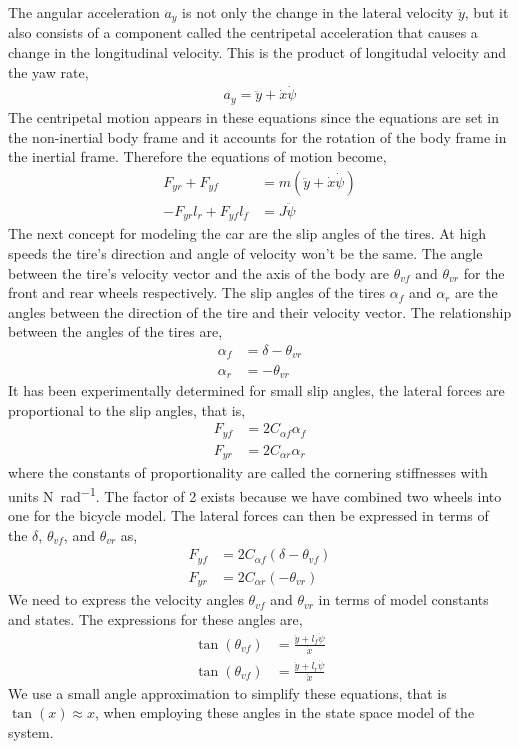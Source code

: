 \documentclass{article}
\begin{document}
The angular acceleration $a_y$ is not only the change in the lateral velocity $\ddot{y}$, but it also consists of a
component called the centripetal acceleration that causes a change in the longitudinal velocity. This is the product
of longitudal velocity and the yaw rate,
\begin{align}
    a_y = \ddot{y} + \dot{x}\dot{\psi}
\end{align}
The centripetal motion appears in these equations since the equations are set in the non-inertial body frame and it
accounts for the rotation of the body frame in the inertial frame. Therefore the equations of motion become,
\begin{align}
    F_{yr} + F_{yf} &= m(\ddot{y} + \dot{x}\dot{\psi}) \\
    -F_{yr}l_r + F_{yf}l_f &= J\ddot{\psi}
\end{align}
The next concept for modeling the car are the slip angles of the tires. At high speeds the tire's direction and angle
of velocity won't be the same. The angle between the tire's velocity vector and the axis of the body are $\theta_{vf}$
and $\theta_{vr}$ for the front and rear wheels respectively. The slip angles of the tires $\alpha_f$ and $\alpha_r$
are the angles between the direction of the tire and their velocity vector. The relationship between the angles of the
tires are,
\begin{align}
    \alpha_f &= \delta - \theta_{vr} \\
    \alpha_r &= -\theta_{vr}
\end{align}
It has been experimentally determined for small slip angles, the lateral forces are proportional to the slip angles,
that is,
\begin{align}
    F_{yf} &= 2C_{\alpha f} \alpha_f \\
    F_{yr} &= 2C_{\alpha r} \alpha_r
\end{align}
where the constants of proportionality are called the cornering stiffnesses with units \unit{\newton\per\radian}. The
factor of 2 exists because we have combined two wheels into one for the bicycle model. The lateral forces can then be
expressed in terms of the $\delta$, $\theta_{vf}$, and $\theta_{vr}$ as,
\begin{align}
    F_{yf} &= 2C_{\alpha f} (\delta - \theta_{vf}) \\
    F_{yr} &= 2C_{\alpha r} (-\theta_{vr})
\end{align}
We need to express the velocity angles $\theta_{vf}$ and $\theta_{vr}$ in terms of model constants and states. The
expressions for these angles are,
\begin{align}
    \tan(\theta_{vf}) &= \frac{\dot{y} + l_f\dot{\psi}}{\dot{x}} \\
    \tan(\theta_{vf}) &= \frac{\dot{y} + l_r\dot{\psi}}{\dot{x}}
\end{align}
We use a small angle approximation to simplify these equations, that is $\tan(x) \approx x$, when employing these
angles in the state space model of the system.
\end{document}
